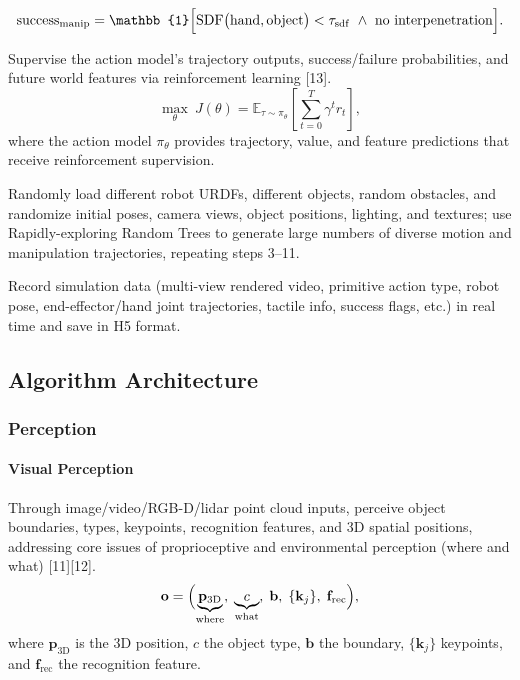 \documentclass[12pt,a4paper]{article}
\begin{document}
\begin{description}
\begin{description}
\begin{equation}
\mathrm{success}_{\mathrm{manip}}=\mathbb{1}\Bigl[\mathrm{SDF}\bigl(\mathrm{hand},\mathrm{object}\bigr)<\tau_{\mathrm{sdf}}\ \wedge\ \text{no interpenetration}\Bigr].
\label{eq:success-manip}
\end{equation}
\item[5.11] Supervise the action model's trajectory outputs, success/failure probabilities, and future world features via reinforcement learning [13].
\begin{equation}
\max_{\theta}\ J(\theta)=\mathbb{E}_{\tau\sim\pi_{\theta}}\left[\sum_{t=0}^{T}\gamma^{t}r_t\right],
\label{eq:rl-objective}
\end{equation}
where the action model $\pi_\theta$ provides trajectory, value, and feature predictions that receive reinforcement supervision.
\item[5.12] Randomly load different robot URDFs, different objects, random obstacles, and randomize initial poses, camera views, object positions, lighting, and textures; use Rapidly-exploring Random Trees to generate large numbers of diverse motion and manipulation trajectories, repeating steps 3--11.
\item[5.13] Record simulation data (multi-view rendered video, primitive action type, robot pose, end-effector/hand joint trajectories, tactile info, success flags, etc.) in real time and save in H5 format.
\end{description}
\end{description}

\subsection{Algorithm Architecture}
\subsubsection{Perception}
\paragraph{Visual Perception}
Through image/video/RGB-D/lidar point cloud inputs, perceive object boundaries, types, keypoints, recognition features, and 3D spatial positions, addressing core issues of proprioceptive and environmental perception (where and what) [11][12].
\begin{equation}
\mathbf{o}=\Bigl(\underbrace{\mathbf{p}_{\mathrm{3D}}}_{\text{where}},\;
\underbrace{c}_{\text{what}},\;\mathbf{b},\;\{\mathbf{k}_j\},\;\mathbf{f}_{\mathrm{rec}}\Bigr),
\label{eq:visual-output}
\end{equation}
where $\mathbf{p}_{\mathrm{3D}}$ is the 3D position, $c$ the object type, $\mathbf{b}$ the boundary, $\{\mathbf{k}_j\}$ keypoints, and $\mathbf{f}_{\mathrm{rec}}$ the recognition feature.
\end{document}
